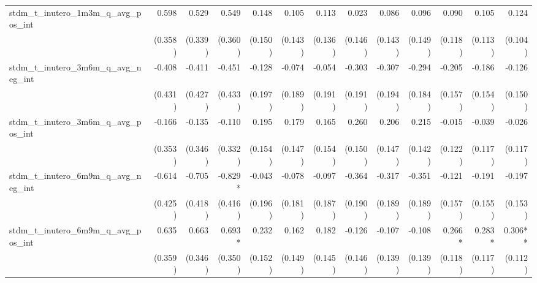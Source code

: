 \begin{tabular}{lrrrrrrrrrrrr}
stdm\_t\_inutero\_1m3m\_q\_avg\_pos\_int    &        0.598 &        0.529 &        0.549 &        0.148 &        0.105 &        0.113 &        0.023 &        0.086 &        0.096 &        0.090 &        0.105 &        0.124 \\ 
                                            &      (0.358) &      (0.339) &      (0.360) &      (0.150) &      (0.143) &      (0.136) &      (0.146) &      (0.143) &      (0.149) &      (0.118) &      (0.113) &      (0.104) \\ 
stdm\_t\_inutero\_3m6m\_q\_avg\_neg\_int    &       -0.408 &       -0.411 &       -0.451 &       -0.128 &       -0.074 &       -0.054 &       -0.303 &       -0.307 &       -0.294 &       -0.205 &       -0.186 &       -0.126 \\ 
                                            &      (0.431) &      (0.427) &      (0.433) &      (0.197) &      (0.189) &      (0.191) &      (0.191) &      (0.194) &      (0.184) &      (0.157) &      (0.154) &      (0.150) \\ 
stdm\_t\_inutero\_3m6m\_q\_avg\_pos\_int    &       -0.166 &       -0.135 &       -0.110 &        0.195 &        0.179 &        0.165 &        0.260 &        0.206 &        0.215 &       -0.015 &       -0.039 &       -0.026 \\ 
                                            &      (0.353) &      (0.346) &      (0.332) &      (0.154) &      (0.147) &      (0.154) &      (0.150) &      (0.147) &      (0.142) &      (0.122) &      (0.117) &      (0.117) \\ 
stdm\_t\_inutero\_6m9m\_q\_avg\_neg\_int    &       -0.614 &       -0.705 &      -0.829* &       -0.043 &       -0.078 &       -0.097 &       -0.364 &       -0.317 &       -0.351 &       -0.121 &       -0.191 &       -0.197 \\ 
                                            &      (0.425) &      (0.418) &      (0.416) &      (0.196) &      (0.181) &      (0.187) &      (0.190) &      (0.189) &      (0.189) &      (0.157) &      (0.155) &      (0.153) \\ 
stdm\_t\_inutero\_6m9m\_q\_avg\_pos\_int    &        0.635 &        0.663 &       0.693* &        0.232 &        0.162 &        0.182 &       -0.126 &       -0.107 &       -0.108 &       0.266* &       0.283* &      0.306** \\ 
                                            &      (0.359) &      (0.346) &      (0.350) &      (0.152) &      (0.149) &      (0.145) &      (0.146) &      (0.139) &      (0.139) &      (0.118) &      (0.117) &      (0.112) \\ 

\end{tabular}
